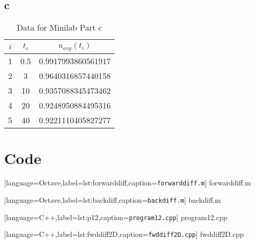 \documentclass[12pt]{article}
\begin{document}
\subsection{c}
\begin{table}[H]
  \centering
  \begin{tabular}[H]{ccc}
    \hline 
    $i$ & $t_i$ & $u_{avg}(t_i)$ \\
    \hline
    1 & 0.5 & 0.9917993860561917 \\
    2 & 3   & 0.9640316857440158 \\
    3 & 10  & 0.9357088345473462 \\
    4 & 20  & 0.9248950884495316 \\
    5 & 40  & 0.9221110405827277 \\
    \hline
  \end{tabular}
  \caption{Data for Minilab Part c}
  \label{tab:mini_c}
\end{table}
\section{Code}

[language=Octave,label=lst:forwarddiff,caption=\texttt{forwarddiff.m}]
{forwarddiff.m}
\pagebreak

[language=Octave,label=lst:backdiff,caption=\texttt{backdiff.m}]
{backdiff.m}
\pagebreak

[language=C++,label=lst:p12,caption=\texttt{program12.cpp}]
{program12.cpp}
\pagebreak

[language=C++,label=lst:fwddiff2D,caption=\texttt{fwddiff2D.cpp}]
{fwddiff2D.cpp}
\end{document}
